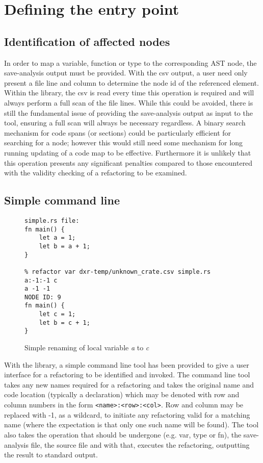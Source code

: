 
\section{Defining the entry point}\label{S:entry}
\subsection{Identification of affected nodes}
In order to map a variable, function or type to the corresponding AST node, the save-analysis output must be provided. With the csv output, a user need only present a file line and column to determine the node id of the referenced element. Within the library, the csv is read every time this operation is required and will always perform a full scan of the file lines. While this could be avoided, there is still the fundamental issue of providing the save-analysis output as input to the tool, ensuring a full scan will always be necessary regardless. A binary search mechanism for code spans (or sections) could be particularly efficient for searching for a node; however this would still need some mechanism for long running updating of a code map to be effective. Furthermore it is unlikely that this operation presents any significant penalties compared to those encountered with the validity checking of a refactoring to be examined.

\subsection{Simple command line}

\begin{figure}[H]
\centering

\begin{verbatim}
simple.rs file:
fn main() {
    let a = 1;
    let b = a + 1;
}

% refactor var dxr-temp/unknown_crate.csv simple.rs  a:-1:-1 c
a -1 -1
NODE ID: 9
fn main() {
    let c = 1;
    let b = c + 1;
}
\end{verbatim}

\caption{Simple renaming of local variable \emph{a} to \emph{c}}
\label{Fig:cmdrename}
\end{figure}


With the library, a simple command line tool has been provided to give a user interface for a refactoring to be identified and invoked. The command line tool takes any new names required for a refactoring and takes the original name and code location (typically a declaration) which may be denoted with row and column numbers in the form {\verb|<name>:<row>:<col>|}. Row and column may be replaced with -1, as a wildcard, to initiate any refactoring valid for a matching name (where the expectation is that only one such name will be found). The tool also takes the operation that should be undergone (e.g. var, type or fn), the save-analysis file, the source file and with that, executes the refactoring, outputting the result to standard output.



